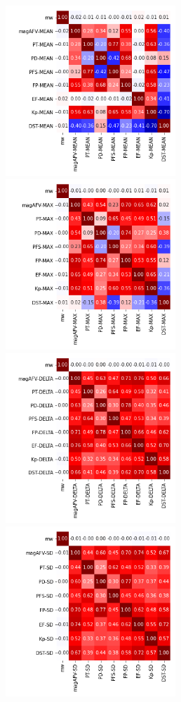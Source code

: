 \documentclass[12pt]{article}
\begin{document}
\begin{figure}
   \includegraphics[width=0.57\textwidth]{all_mean_1.png}
   \includegraphics[width=0.57\textwidth]{all_max_1.png}
   \includegraphics[width=0.57\textwidth]{all_delta_1.png}
   \includegraphics[width=0.57\textwidth]{all_sd_1.png}
\end{figure}
\end{document}
